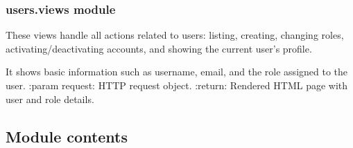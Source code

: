 \documentclass[a4paper,11pt,spanish]{sphinxmanual}
\begin{document}
\sphinxstepscope


\subsubsection{users.views module}
\label{\detokenize{api/users/users.views:module-users.views}}\label{\detokenize{api/users/users.views:users-views-module}}\label{\detokenize{api/users/users.views::doc}}
\sphinxAtStartPar
These views handle all actions related to users:
listing, creating, changing roles, activating/deactivating accounts,
and showing the current user’s profile.

\begin{fulllineitems}
\label{\detokenize{api/users/users.views:users.views.profile}}
\pysigstartsignatures
\pysiglinewithargsret
{}
{}
{}
\pysigstopsignatures
\sphinxAtStartPar
It shows basic information such as username, email, and
the role assigned to the user.
:param request: HTTP request object.
:return: Rendered HTML page with user and role details.

\end{fulllineitems}



\subsection{Module contents}
\label{\detokenize{api/users/users:module-users}}\label{\detokenize{api/users/users:module-contents}}
\end{document}
